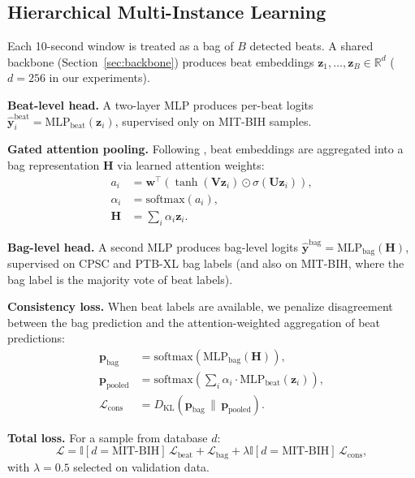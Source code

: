 \documentclass[conference]{IEEEtran}
\begin{document}
\subsection{Hierarchical Multi-Instance Learning}

Each 10-second window is treated as a bag of $B$ detected beats. A shared backbone (Section~\ref{sec:backbone}) produces beat embeddings $\mathbf{z}_1, \ldots, \mathbf{z}_B \in \mathbb{R}^d$ ($d=256$ in our experiments).

\textbf{Beat-level head.} A two-layer MLP produces per-beat logits $\hat{\mathbf{y}}_i^{\text{beat}} = \text{MLP}_{\text{beat}}(\mathbf{z}_i)$, supervised only on MIT-BIH samples.

\textbf{Gated attention pooling.} Following \cite{ilse2018}, beat embeddings are aggregated into a bag representation $\mathbf{H}$ via learned attention weights:
\begin{align}
a_i    &= \mathbf{w}^\top (\tanh(\mathbf{V} \mathbf{z}_i) \odot \sigma(\mathbf{U} \mathbf{z}_i)), \\
\alpha_i &= \text{softmax}(a_i), \\
\mathbf{H} &= \textstyle\sum_i \alpha_i \mathbf{z}_i.
\end{align}

\textbf{Bag-level head.} A second MLP produces bag-level logits $\hat{\mathbf{y}}^{\text{bag}} = \text{MLP}_{\text{bag}}(\mathbf{H})$, supervised on CPSC and PTB-XL bag labels (and also on MIT-BIH, where the bag label is the majority vote of beat labels).

\textbf{Consistency loss.} When beat labels are available, we penalize disagreement between the bag prediction and the attention-weighted aggregation of beat predictions:
\begin{align}
\mathbf{p}_{\text{bag}}    &= \text{softmax}(\text{MLP}_{\text{bag}}(\mathbf{H})), \\
\mathbf{p}_{\text{pooled}} &= \text{softmax}(\textstyle\sum_i \alpha_i \cdot \text{MLP}_{\text{beat}}(\mathbf{z}_i)), \\
\mathcal{L}_{\text{cons}}  &= D_{\text{KL}}(\mathbf{p}_{\text{bag}} \,\|\, \mathbf{p}_{\text{pooled}}).
\end{align}

\textbf{Total loss.} For a sample from database $d$:
\begin{equation}
\mathcal{L} = \mathbb{I}[d{=}\text{MIT-BIH}]\,\mathcal{L}_{\text{beat}} + \mathcal{L}_{\text{bag}} + \lambda \mathbb{I}[d{=}\text{MIT-BIH}]\,\mathcal{L}_{\text{cons}},
\end{equation}
with $\lambda=0.5$ selected on validation data.
\end{document}
